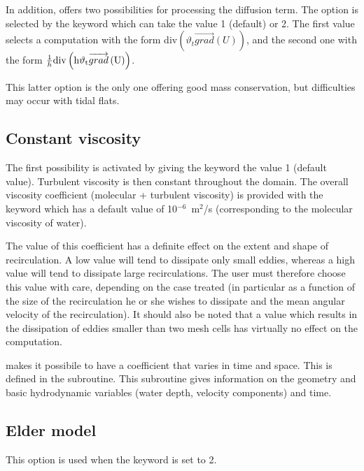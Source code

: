 In addition,  offers two possibilities for processing the diffusion
term.
The option is selected by the keyword
which can take the value 1 (default) or 2.
The first value selects a computation with the form
div$\left({\vartheta }_t\overrightarrow{grad}\left(U\right)\right)$,
and the second one with the form
$\frac{1}{h}\rm{div}\left({h\vartheta_t }\overrightarrow{grad}\left(U\right)\right)$.

This latter option is the only one offering good mass conservation,
but difficulties may occur with tidal flats.


\subsection{Constant viscosity}

The first possibility is activated by giving the keyword
 the value 1 (default value).
Turbulent viscosity is then constant throughout the domain.
The overall viscosity coefficient (molecular + turbulent viscosity) is provided
with the keyword  which has a default value of
10$^{-6}$~m$^2$/s (corresponding to the molecular viscosity of water).

The value of this coefficient has a definite effect on the extent and shape of
recirculation.
A low value will tend to dissipate only small eddies, whereas a high value will
tend to dissipate large recirculations.
The user must therefore choose this value with care, depending on the case
treated (in particular as a function of the size of the recirculation he or she
wishes to dissipate and the mean angular velocity of the recirculation).
It should also be noted that a value which results in the dissipation of eddies
smaller than two mesh cells has virtually no effect on the computation.

 makes it possibile to have a coefficient that varies in time and
space.
This is defined in the  subroutine.
This subroutine gives information on the geometry and basic hydrodynamic
variables (water depth, velocity components) and time.


\subsection{Elder model}

This option is used when the keyword  is set to 2.

